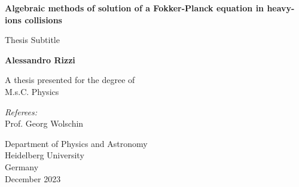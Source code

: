 \begin{titlepage}
    \begin{center}
        \vspace*{1cm}
            
        \Huge
        \textbf{Algebraic methods of solution of a Fokker-Planck equation in heavy-ions collisions}
            
        \vspace{0.5cm}
        \LARGE
        Thesis Subtitle
            
        \vspace{1.5cm}
            
        \textbf{Alessandro Rizzi}
            
        \vfill
            
        A thesis presented for the degree of\\
        M.s.C. Physics
            
        \vspace{0.8cm}

        \Large
        \textit{Referees:}\\
        Prof. Georg Wolschin
            
        \vspace{0.8cm}    
        \Large
        Department of Physics and Astronomy\\
        Heidelberg University\\
        Germany\\
        December 2023
            
    \end{center}
\end{titlepage}